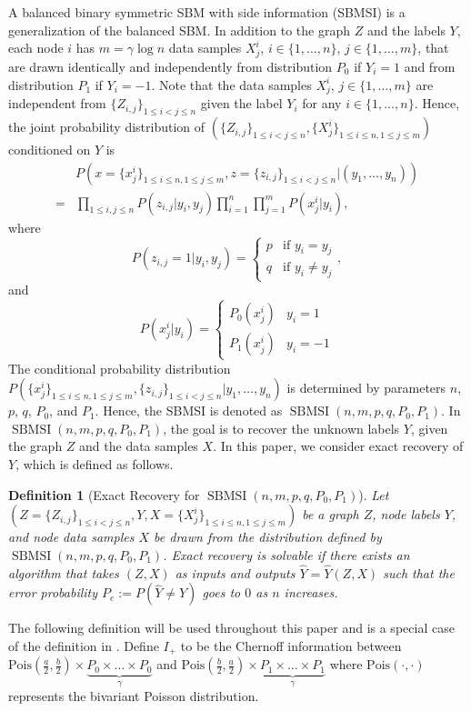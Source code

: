 \documentclass[conference]{IEEEtran}
\newtheorem{definition}{Definition}
\DeclareMathOperator{\SBMSI}{SBMSI}
\begin{document}
	
	A balanced binary symmetric SBM with side information (SBMSI) is a generalization of the balanced SBM. In addition to the graph $Z$ and the labels $Y$, each node $i$ has $m=\gamma \log n$ data samples $X^i_{j}$, $i\in \{1,\ldots,n\}$, $j\in \{1,\ldots,m\}$, that are drawn identically and independently from distribution $P_0$ if $Y_i=1$ and from distribution $P_1$ if $Y_i=-1$. Note that the data samples $X^i_{j}$, $j\in \{1,\ldots,m\}$ are independent from $\{Z_{i,j}\}_{1\le i<j\le n}$ given the label $Y_i$ for any $i\in\{1,\ldots,n\}$. Hence, the joint probability distribution of $(\{Z_{i,j}\}_{1\le i<j\le n},\{X^i_{j}\}_{1\le i\le n,1\le j\le m})$ conditioned on $Y$ is
	\begin{align}\label{eq:lh}
		&P(x=\{x^i_{j}\}_{1\le i\le n,1\le j\le m},z=\{z_{i,j}\}_{1\le i<j\le n}| (y_1,\ldots,y_n)) \nonumber\\
		=& \prod_{1\le i,j\le n}P(z_{i,j}|y_i,y_j)\prod_{i=1}^n \prod_{j=1}^m P(x^i_j|y_i), 
	\end{align}
	where 
	\begin{equation*}
		P  (z_{i,j}=1|y_i,y_j) = \begin{cases}
			p & \text{if } y_i=y_j \\
			q & \text{if } y_i\ne y_j
		\end{cases},
	\end{equation*}
	and
	\begin{equation*}
		P(x^i_j|y_i) = \begin{cases}
			P_0(x^i_j) & y_i = 1 \\
			P_1(x^i_j) & y_i = -1
		\end{cases}
	\end{equation*}
	The conditional probability distribution $P(\{x^i_{j}\}_{1\le i\le n,1\le j\le m},\{z_{i,j}\}_{1\le i<j\le n}| y_1,\ldots,y_n)$ is determined by parameters $n$, $p$, $q$, $P_0$, and $P_1$. Hence, 
	the SBMSI is denoted as $\SBMSI(n,m,p,q,P_0,P_1)$.
	In $\SBMSI(n,m,p,q,P_0,P_1)$, the goal is to recover the unknown labels $Y$, given the graph $Z$ and the data samples $X$. In this paper, we consider exact recovery of $Y$, which is defined as follows.
	\begin{definition}[Exact Recovery for $\SBMSI(n,m,p,q,P_0,P_1)$]
		Let
		$(Z=\{Z_{i,j}\}_{1\le i<j\le n},Y,X=\{X^i_{j}\}_{1\le i\le n,1\le j\le m})$ be a graph $Z$, node labels $Y$, and node data samples $X$ be drawn from the distribution defined by $\SBMSI(n,m,p,q,P_0,P_1)$.
		Exact recovery is solvable if there exists an algorithm that takes $(Z,X)$ as inputs and outputs $\hat{Y}=\hat{Y}(Z,X)$ such that the error probability $P_e:=P(\hat{Y} \neq Y)$ goes to $0$ as $n$ increases.
	\end{definition}
	The following definition will be used throughout this paper and is a special case of the definition in \cite{abbe17sideinfo}. Define $I_+$ to be the Chernoff information
	between $\textrm{Pois}(\frac{a}{2},\frac{b}{2})\times \underbrace{P_0 \times \dots \times P_0}_{\gamma}$
	and $\textrm{Pois}(\frac{b}{2}, \frac{a}{2})\times \underbrace{P_1 \times \dots \times P_1}_{\gamma}$ where $\textrm{Pois}(\cdot,\cdot)$ represents the bivariant Poisson distribution. 
	
\end{document}
